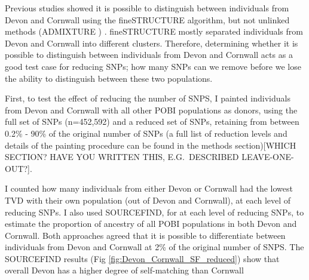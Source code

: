 Previous studies showed it is possible to distinguish between individuals from Devon and Cornwall using the fineSTRUCTURE algorithm, but not unlinked methods (ADMIXTURE \cite{alexander2009fast}) \cite{Leslie2015}. fineSTRUCTURE mostly separated individuals from Devon and Cornwall into different clusters. Therefore, determining whether it is possible to distinguish between individuals from Devon and Cornwall acts as a good test case for reducing SNPs; how many SNPs can we remove before we lose the ability to distinguish between these two populations. 

First, to test the effect of reducing the number of SNPS, I painted individuals from Devon and Cornwall with all other POBI populations as donors, using the full set of SNPs (n=452,592) and a reduced set of SNPs, retaining from between 0.2\% - 90\% of the original number of SNPs (a full list of reduction levels and details of the painting procedure can be found in the methods section){\color{red}[WHICH SECTION? HAVE YOU WRITTEN THIS, E.G.\ DESCRIBED LEAVE-ONE-OUT?]}. 

I counted how many individuals from either Devon or Cornwall had the lowest TVD with their own population (out of Devon and Cornwall), at each level of reducing SNPs. I also used SOURCEFIND, for at each level of reducing SNPs, to estimate the proportion of ancestry of all POBI populations in both Devon and Cornwall. Both approaches agreed that it is possible to differentiate between individuals from Devon and Cornwall at 2\% of the original number of SNPS. The SOURCEFIND results (Fig \ref{fig:Devon_Cornwall_SF_reduced}) show that overall Devon has a higher degree of self-matching than Cornwall 



